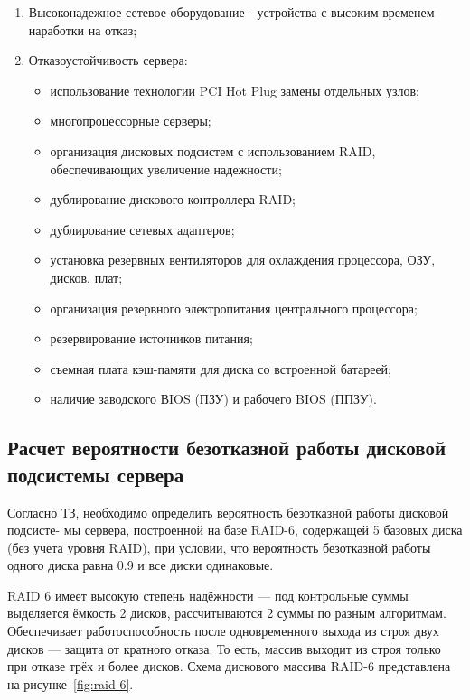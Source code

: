 \documentclass[russian,utf8,emptystyle]{eskdtext}
\begin{document}
\begin{enumerate}[label=\arabic*.]
\item Высоконадежное сетевое оборудование - устройства с высоким временем наработки на отказ;
\item Отказоустойчивость сервера:
\begin{itemize}[label=-]
\item использование технологии PCI Hot Plug замены отдельных узлов;
\item многопроцессорные серверы;
\item организация дисковых подсистем с использованием RAID, обеспечивающих увеличение
надежности;
\item дублирование дискового контроллера RAID;
\item дублирование сетевых адаптеров;
\item установка резервных вентиляторов для охлаждения процессора, ОЗУ, дисков, плат;
\item организация резервного электропитания центрального процессора;
\item резервирование источников питания;
\item съемная плата кэш-памяти для диска со встроенной батареей;
\item наличие заводского ВIOS (ПЗУ) и рабочего BIOS (ППЗУ).
\end{itemize}

\end{enumerate}

\clearpage
\subsection{Расчет вероятности безотказной работы дисковой подсистемы сервера}
Согласно ТЗ, необходимо определить вероятность безотказной работы дисковой подсисте-
мы сервера, построенной на базе RAID-6, содержащей 5 базовых диска (без учета уровня RAID),
при условии, что вероятность безотказной работы одного диска равна 0.9 и все диски одинаковые.

RAID 6 имеет высокую степень надёжности — под контрольные суммы выделяется ёмкость
2 дисков, рассчитываются 2 суммы по разным алгоритмам. Обеспечивает работоспособность после
одновременного выхода из строя двух дисков — защита от кратного отказа. То есть, массив выходит
из строя только при отказе трёх и более дисков. Схема дискового массива RAID-6 представлена на рисунке~\ref{fig:raid-6}.
\end{document}

